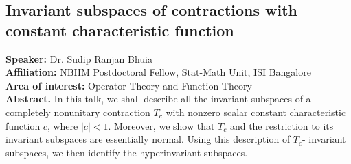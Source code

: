 \subsection*{Invariant subspaces of contractions with constant characteristic function} %
\noindent
\textbf{Speaker:} Dr. Sudip Ranjan Bhuia \\ %
\textbf{Affiliation:} NBHM Postdoctoral Fellow, Stat-Math Unit, ISI Bangalore \\ %
\textbf{Area of interest:} Operator Theory and Function Theory \\ 

\noindent\textbf{Abstract.} In this talk, we shall describe all the invariant subspaces of a completely nonunitary contraction $T_c$ with nonzero scalar constant characteristic function $c$, where $|c|<1$. Moreover, we show that $T_c$ and the restriction to its invariant subspaces are essentially normal. Using this description of $T_c$- invariant subspaces, we then identify the hyperinvariant subspaces.



